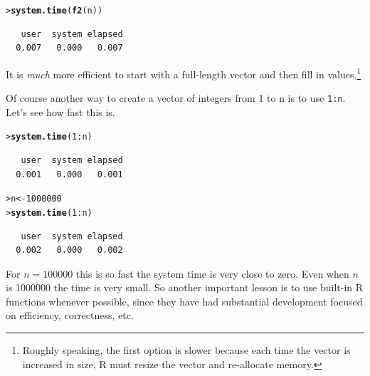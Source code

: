 \documentclass[12pt,oneside]{book}\usepackage[]{graphicx}\usepackage[]{color}
\makeatletter
\newcommand{\hlnum}[1]{\textcolor[rgb]{0.686,0.059,0.569}{#1}}%
\newcommand{\hlopt}[1]{\textcolor[rgb]{0,0,0}{#1}}%
\newcommand{\hlstd}[1]{\textcolor[rgb]{0.345,0.345,0.345}{#1}}%
\newcommand{\hlkwb}[1]{\textcolor[rgb]{0.69,0.353,0.396}{#1}}%
\newcommand{\hlkwd}[1]{\textcolor[rgb]{0.737,0.353,0.396}{\textbf{#1}}}%
\newenvironment{kframe}{%
 \def\at@end@of@kframe{}%
 \ifinner\ifhmode%
  \def\at@end@of@kframe{\end{minipage}}%
  \begin{minipage}{\columnwidth}%
 \fi\fi%
 \def\FrameCommand##1{\hskip\@totalleftmargin \hskip-\fboxsep
 \colorbox{shadecolor}{##1}\hskip-\fboxsep
     \hskip-\linewidth \hskip-\@totalleftmargin \hskip\columnwidth}%
 \MakeFramed {\advance\hsize-\width
   \@totalleftmargin\z@ \linewidth\hsize
   \@setminipage}}%
 {\par\unskip\endMakeFramed%
 \at@end@of@kframe}
\newenvironment{knitrout}{}{} %
\makeatother
\begin{document}
\begin{enumerate}
\begin{knitrout}
\begin{kframe}
\begin{verbatim}
\end{verbatim}
\begin{alltt}
\hlstd{> }\hlkwd{system.time}\hlstd{(}\hlkwd{f2}\hlstd{(n))}
\end{alltt}
\begin{verbatim}
   user  system elapsed 
  0.007   0.000   0.007 
\end{verbatim}
\end{kframe}
\end{knitrout}
It is \emph{much} more efficient to start with a full-length vector and then fill in values.\footnote{Roughly speaking, the first option is slower because each time the vector is increased in size, R must resize the vector and re-allocate memory.} 

Of course another way to create a vector of integers from 1 to n is to use \verb+1:n+. Let's see how fast this is.
\begin{knitrout}
\color{fgcolor}\begin{kframe}
\begin{alltt}
\hlstd{> }\hlkwd{system.time}\hlstd{(}\hlnum{1}\hlopt{:}\hlstd{n)}
\end{alltt}
\begin{verbatim}
   user  system elapsed 
  0.001   0.000   0.001 
\end{verbatim}
\begin{alltt}
\hlstd{> }\hlstd{n} \hlkwb{<-} \hlnum{1000000}
\hlstd{> }\hlkwd{system.time}\hlstd{(}\hlnum{1}\hlopt{:}\hlstd{n)}
\end{alltt}
\begin{verbatim}
   user  system elapsed 
  0.002   0.000   0.002 
\end{verbatim}
\end{kframe}
\end{knitrout}
For $n=100000$ this is so fast the system time is very close to zero. Even when $n$ is 1000000 the time is very small. So another important lesson is to use built-in R functions whenever possible, since they have had substantial development focused on efficiency, correctness, etc.
\end{enumerate}
\end{document}
